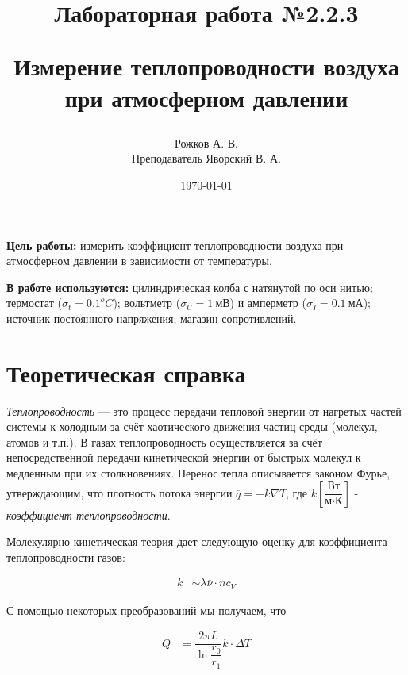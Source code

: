 \documentclass[a4paper, 12pt]{article}
\title{\begin{center}Лабораторная работа №2.2.3\end{center}
Измерение теплопроводности воздуха при атмосферном давлении}
\author{Рожков А. В. \\ Преподаватель Яворский В. А.}
\date{\today}
\begin{document}
    \maketitle
    \newpage

    \textbf{Цель работы:} измерить коэффициент теплопроводности воздуха при атмосферном давлении в зависимости от температуры.

    \textbf{В работе используются:} цилиндрическая колба с натянутой по оси нитью; термостат ($\sigma_t = 0.1^o C$); вольтметр ($\sigma_U = 1~мВ$) и амперметр ($\sigma_I = 0.1~мА$); источник постоянного напряжения; магазин сопротивлений.

    \section{Теоретическая справка}

        \textit{Теплопроводность} — это процесс передачи тепловой энергии от нагретых частей системы к холодным за счёт хаотического движения частиц среды (молекул, атомов и т.п.). В газах теплопроводность осуществляется за счёт  непосредственной передачи кинетической энергии от быстрых молекул к медленным при их столкновениях. Перенос тепла описывается законом Фурье, утверждающим, что плотность потока энергии $\overline{q} = -k \nabla T$, где $k \left[ \dfrac{\text{Вт}}{\text{м} \cdot \text{К}} \right]$ - \textit{коэффициент теплопроводности}.

        Молекулярно-кинетическая теория дает следующую оценку для коэффициента теплопроводности газов:

        \begin{align}
            k &\sim \lambda \overline{\nu} \cdot n c_V \label{k}
        \end{align}

        С помощью некоторых преобразований мы получаем, что

        \begin{align}
            Q &= \dfrac{2 \pi L}{\ln \dfrac{r_0}{r_1}} k  \cdot \Delta T \label{Q}
        \end{align}
\end{document}
